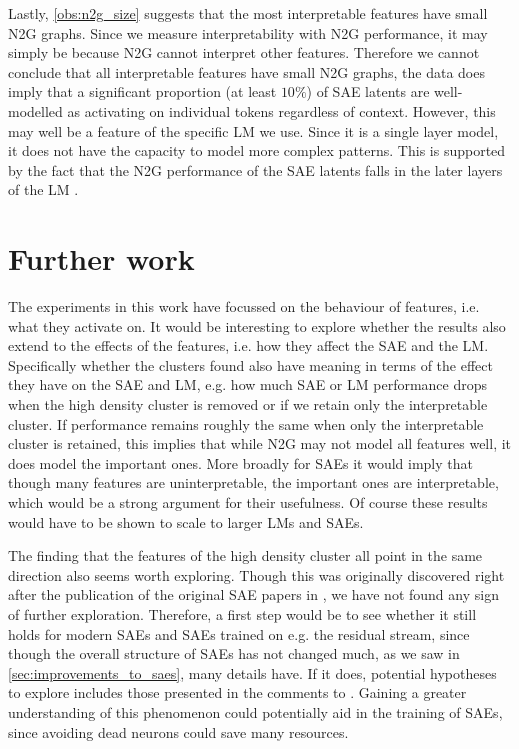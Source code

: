 Lastly, \ref{obs:n2g_size} suggests that the most interpretable features have small \ac{N2G} graphs.
Since we measure interpretability with \ac{N2G} performance, it may simply be because \ac{N2G} cannot interpret other features.
Therefore we cannot conclude that all interpretable features have small \ac{N2G} graphs, the data does imply that a significant proportion (at least $10\%$) of \ac{SAE} latents are well-modelled as activating on individual tokens regardless of context.
However, this may well be a feature of the specific \ac{LM} we use.
Since it is a single layer model, it does not have the capacity to model more complex patterns.
This is supported by the fact that the \ac{N2G} performance of the \ac{SAE} latents falls in the later layers of the \ac{LM} \parencite{foote_neuron_2023}.


\section{Further work}
The experiments in this work have focussed on the behaviour of features, i.e. what they activate on.
It would be interesting to explore whether the results also extend to the effects of the features, i.e. how they affect the \ac{SAE} and the \ac{LM}.
Specifically whether the clusters found also have meaning in terms of the effect they have on the \ac{SAE} and \ac{LM}, e.g. how much \ac{SAE} or \ac{LM} performance drops when the high density cluster is removed or if we retain only the interpretable cluster.
If performance remains roughly the same when only the interpretable cluster is retained, this implies that while \ac{N2G} may not model all features well, it does model the important ones.
More broadly for \acp{SAE} it would imply that though many features are uninterpretable, the important ones are interpretable, which would be a strong argument for their usefulness.
Of course these results would have to be shown to scale to larger \acp{LM} and \acp{SAE}.

The finding that the features of the high density cluster all point in the same direction also seems worth exploring.
Though this was originally discovered right after the publication of the original \ac{SAE} papers in \textcite{nanda_open_2023}, we have not found any sign of further exploration.
Therefore, a first step would be to see whether it still holds for modern \acp{SAE} and \acp{SAE} trained on e.g. the residual stream, since though the overall structure of \acp{SAE} has not changed much, as we saw in \autoref{sec:improvements_to_saes}, many details have.
If it does, potential hypotheses to explore includes those presented in the comments to \textcite{nanda_open_2023}.
Gaining a greater understanding of this phenomenon could potentially aid in the training of \acp{SAE}, since avoiding dead neurons could save many resources.

